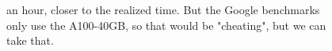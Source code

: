 \documentclass[12pt]{article}
\begin{document}
\begin{figure}[!htb]
\begin{minipage}[t]{0.65\textwidth}
an hour, closer to the realized time. But the Google benchmarks only use the 
A100-40GB, so that would be "cheating", but we can take that.
\vspace*{-3em}
\end{minipage}%
\hspace{25pt}
\begin{minipage}[t]{.4\textwidth}
\end{minipage}
\end{figure}
\pagebreak
\end{document}
